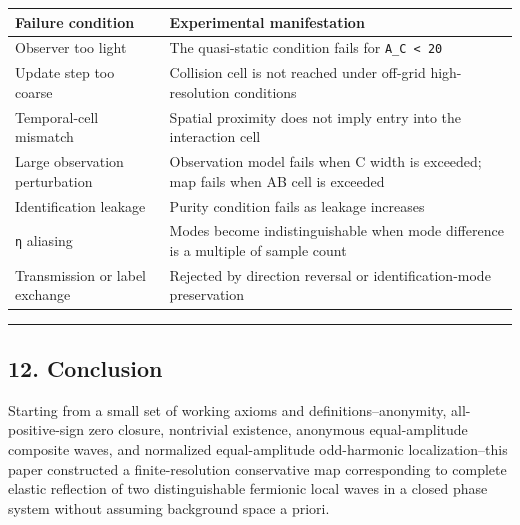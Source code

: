 \documentclass[
  a4paper,
]{article}
\newcounter{none} %
\begin{document}
{\def\LTcaptype{none} %
\begin{longtable}[]{@{}
  >{\raggedright\arraybackslash}p{}
  >{\raggedright\arraybackslash}p{}@{}}
\toprule\noalign{}
\begin{minipage}[b]{\linewidth}\raggedright
Failure condition
\end{minipage} & \begin{minipage}[b]{\linewidth}\raggedright
Experimental manifestation
\end{minipage} \\
\midrule\noalign{}
\endhead
\bottomrule\noalign{}
\endlastfoot
Observer too light & The quasi-static condition fails for
\texttt{A\_C\ \textless{}\ 20} \\
Update step too coarse & Collision cell is not reached under off-grid
high-resolution conditions \\
Temporal-cell mismatch & Spatial proximity does not imply entry into the
interaction cell \\
Large observation perturbation & Observation model fails when C width is
exceeded; map fails when AB cell is exceeded \\
Identification leakage & Purity condition fails as leakage increases \\
\texttt{η} aliasing & Modes become indistinguishable when mode
difference is a multiple of sample count \\
Transmission or label exchange & Rejected by direction reversal or
identification-mode preservation \\
\end{longtable}
}

\begin{center}\rule{0.5\linewidth}{0.5pt}\end{center}

\subsection{12. Conclusion}\label{conclusion}

Starting from a small set of working axioms and definitions--anonymity,
all-positive-sign zero closure, nontrivial existence, anonymous
equal-amplitude composite waves, and normalized equal-amplitude
odd-harmonic localization--this paper constructed a finite-resolution
conservative map corresponding to complete elastic reflection of two
distinguishable fermionic local waves in a closed phase system without
assuming background space a priori.
\end{document}
